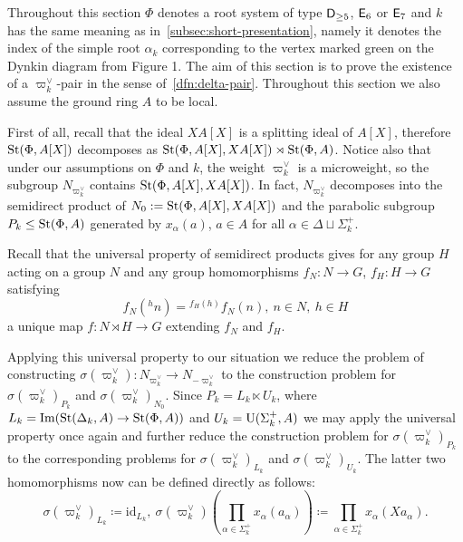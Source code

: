 Throughout this section $\Phi$ denotes a root system of type $\mathsf{D}_{\geq 5}$, $\mathsf{E}_6$ or $\mathsf{E}_7$ and
 $k$ has the same meaning as in~\cref{subsec:short-presentation}, namely
 it denotes the index of the simple root $\alpha_k$ corresponding to the vertex marked green on the Dynkin diagram from Figure 1.
The aim of this section is to prove the existence of a $\varpi_k^\vee$-pair in the sense of~\cref{dfn:delta-pair}.
Throughout this section we also assume the ground ring $A$ to be local.

First of all, recall that the ideal $XA[X]$ is a splitting ideal of $A[X]$, therefore
 $\operatorname{St}(\Phi, A[X])$ decomposes as $\operatorname{St}(\Phi, A[X], XA[X]) \rtimes \operatorname{St}(\Phi, A)$.
Notice also that under our assumptions on $\Phi$ and $k$, the weight $\varpi_k^\vee$ is a microweight, so the subgroup $N_{\varpi_k^\vee}$ contains $\operatorname{St}(\Phi, A[X], XA[X])$.
In fact, $N_{\varpi_k^\vee}$ decomposes into the semidirect product of $N_0 := \operatorname{St}(\Phi, A[X], XA[X])$ and the parabolic subgroup $P_k \leq \operatorname{St}(\Phi, A)$
 generated by $x_\alpha(a)$, $a \in A$ for all $\alpha \in \Delta \sqcup \Sigma^+_k$.

Recall that the universal property of semidirect products gives for any group $H$ acting on a group $N$
 and any group homomorphisms $f_N\colon N \to G$, $f_H\colon H \to G$ satisfying
\begin{equation}
    \label{eq:coherence-condition} f_N({}^hn) = {}^{f_H(h)} f_N(n),\ n\in N,\ h\in H
\end{equation}
a unique map $f\colon N \rtimes H \to G$ extending $f_N$ and $f_H$.

Applying this universal property to our situation we reduce the problem of constructing $\sigma(\varpi_k^\vee) \colon N_{\varpi_k^\vee} \to N_{-\varpi_k^\vee}$
 to the construction problem for $\sigma(\varpi_k^\vee)_{P_k}$ and $\sigma(\varpi_k^\vee)_{N_0}$.
Since $P_k = L_k \ltimes U_k$, where $L_k = \mathrm{Im}(\operatorname{St}(\Delta_k, A) \to \operatorname{St}(\Phi, A))$
and $U_k = \operatorname{U}(\Sigma_k^+, A)$ we may apply the universal property once again and further reduce the construction problem for $\sigma(\varpi_k^\vee)_{P_k}$
 to the corresponding problems for $\sigma(\varpi_k^\vee)_{L_k}$ and $\sigma(\varpi_k^\vee)_{U_k}$.
The latter two homomorphisms now can be defined directly as follows:
\[\sigma(\varpi_k^\vee)_{L_k} \coloneqq \mathrm{id}_{L_k},\ \sigma(\varpi_k^\vee)\left(\prod\limits_{\alpha \in \Sigma_k^+} x_\alpha(a_\alpha)\right) \coloneqq \prod\limits_{\alpha \in \Sigma_k^+} x_\alpha(Xa_\alpha).\]


